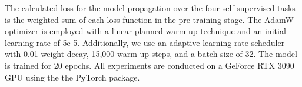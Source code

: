 \documentclass[letterpaper]{article} %
\newcommand{\kibitz}[2]{\ifnum\Comments=1{\textcolor{#1}{#2}}\fi}
\newcommand{\di}[1]{\kibitz{blue}{[DI:#1]}}
\begin{document}



The calculated loss for the model propagation over the four self supervised tasks is the weighted sum of each loss function in the pre-training stage. 
The AdamW optimizer is employed with a linear planned warm-up technique and an initial learning rate of 5e-5.
Additionally, we use an adaptive learning-rate scheduler with 0.01 weight decay, 15,000 warm-up steps, and a batch size of 32. The model is trained for 20 epochs. 
All experiments are conducted on a GeForce RTX 3090 GPU using the the PyTorch package.
\end{document}
